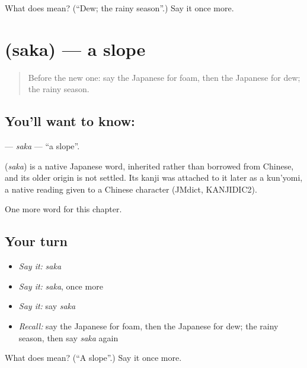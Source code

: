 \begin{tcolorbox}[breakable,colback=teal!4,colframe=teal!35!black,title={Before you move on}]
What does  mean? (\textquotedblleft{}Dew; the rainy season\textquotedblright{}.) Say it once more.
\end{tcolorbox}
\section[\texorpdfstring{\ja{さか} (saka)}{さか (saka)}]{ (saka) — a slope}

\label{lesson:JA-C107-saka}



\begin{quote}
Before the new one: say the Japanese for foam, then the Japanese for dew; the rainy season.
\end{quote}

\subsection*{You'll want to know: }
\textbf{} — \emph{saka} — \textquotedblleft{}a slope\textquotedblright{}.

\begin{cousinweb}
\textbf{} (\emph{saka}) is a native Japanese word, inherited rather than borrowed from Chinese, and its older origin is not settled. Its kanji was attached to it later as a kun'yomi, a native reading given to a Chinese character (JMdict, KANJIDIC2).
\end{cousinweb}

\begin{grammarlens}[title={What you've built}]
One more word for this chapter.
\end{grammarlens}

\subsection*{Your turn}
\begin{itemize}
\raggedright
  \item \emph{Say it:} \emph{saka}
  \item \emph{Say it:} \emph{saka}, once more
  \item \emph{Say it:} say \emph{saka}
  \item \emph{Recall:} say the Japanese for foam, then the Japanese for dew; the rainy season, then say \emph{saka} again
\end{itemize}

\begin{tcolorbox}[breakable,colback=teal!4,colframe=teal!35!black,title={Before you move on}]
What does  mean? (\textquotedblleft{}A slope\textquotedblright{}.) Say it once more.
\end{tcolorbox}
